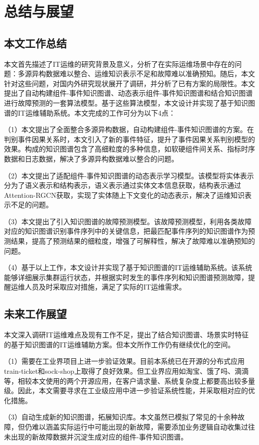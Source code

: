 \chapter{总结与展望}
\section{本文工作总结}
本文首先描述了IT运维的研究背景及意义，分析了在实际运维场景中存在的问题：多源异构数据难以整合、运维知识表示不足和故障难以准确预知。随后，本文针对这些问题，对国内外研究现状展开了调研，并分析了已有方案的局限性。本文提出了自动构建组件-事件知识图谱、动态表示组件-事件知识图谱和结合知识图谱进行故障预测的一套算法模型。基于这些算法模型，本文设计并实现了基于知识图谱的IT运维辅助系统。本文完成的工作可分为以下4点：

（1）本文提出了全面整合多源异构数据，自动构建组件-事件知识图谱的方案。在判别事件因果关系时，本文引入了新的事件特征，提升了事件因果关系判别模型的效果。构成的知识图谱包含了高细粒度的多种信息，如软硬组件间关系、指标时序数据和日志数据，解决了多源异构数据难以整合的问题。

（2）本文提出了适配组件-事件知识图谱的动态表示学习模型。该模型将实体表示分为了语义表示和结构表示，语义表示通过实体文本信息获取，结构表示通过Attention-RGCN获取，实现了实体随上下文变化的动态表示，解决了运维知识表示不足的问题。

（3）本文提出了引入知识图谱的故障预测模型。该故障预测模型，利用各类故障对应的知识图谱识别事件序列中的关键信息，把最匹配事件序列的知识图谱作为预测结果，提高了预测结果的细粒度，增强了可解释性，解决了故障难以准确预知的问题。

（4）基于以上工作，本文设计并实现了基于知识图谱的IT运维辅助系统。该系统能够详细展示集群运行状态，并根据实时发生的事件序列和知识图谱预测故障，提醒运维人员及时采取应对措施，满足了实际的IT运维需求。

\section{未来工作展望}
本文深入调研IT运维难点及现有工作不足，提出了结合知识图谱、场景实时特征的基于知识图谱的IT运维辅助方案。但本文所作工作仍有继续优化的空间。

（1）需要在工业界项目上进一步验证效果。目前本系统已在开源的分布式应用train-ticket和sock-shop上取得了良好效果。但工业界应用如淘宝、饿了吗、滴滴等，相较本文使用的两个开源应用，在客户请求量、系统复杂度上都要高出较多量级。因此，本文需要寻求在工业级应用中进一步验证系统性能，并采取相对应的优化措施。

（3）自动生成新的知识图谱，拓展知识库。本文虽然已模拟了常见的十余种故障，但仍难以涵盖实际运行中可能出现的新故障，需要添加业务逻辑自动收集过往未出现的新故障数据并沉淀生成对应的组件-事件知识图谱。